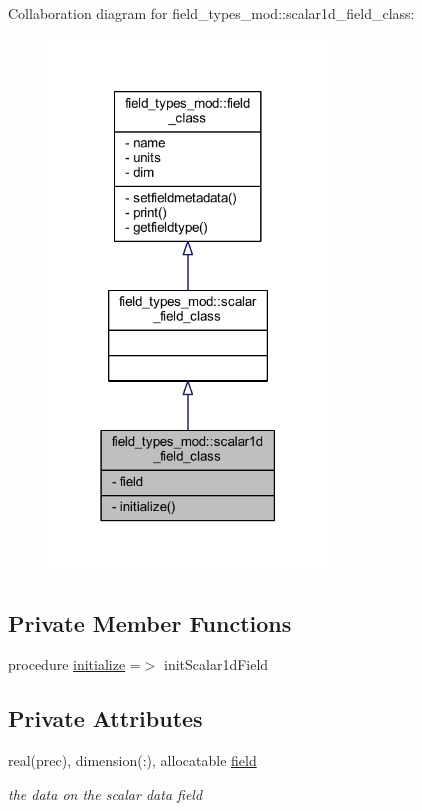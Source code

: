 Collaboration diagram for field\+\_\+types\+\_\+mod\+:\+:scalar1d\+\_\+field\+\_\+class\+:
\nopagebreak
\begin{figure}[H]
\begin{center}
\leavevmode
\includegraphics[width=210pt]{structfield__types__mod_1_1scalar1d__field__class__coll__graph}
\end{center}
\end{figure}
\subsection*{Private Member Functions}
\begin{DoxyCompactItemize}
\item 
procedure \mbox{\hyperlink{structfield__types__mod_1_1scalar1d__field__class_a5c7c27f2349aa8c3466ce6c4ed2bc5d0}{initialize}} =$>$ init\+Scalar1d\+Field
\end{DoxyCompactItemize}
\subsection*{Private Attributes}
\begin{DoxyCompactItemize}
\item 
real(prec), dimension(\+:), allocatable \mbox{\hyperlink{structfield__types__mod_1_1scalar1d__field__class_a826c1d64b3a7cd5c6a17834898741608}{field}}
\begin{DoxyCompactList}\small\item\em the data on the scalar data field \end{DoxyCompactList}\end{DoxyCompactItemize}


